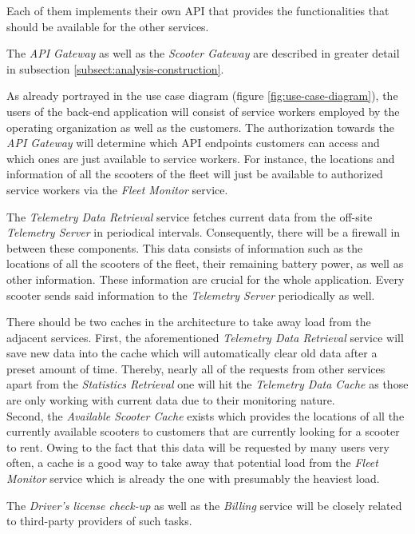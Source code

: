 \documentclass[12pt,a4paper,twoside]{report}
\begin{document}
Each of them implements their own API that provides the functionalities that
should be available for the other services.

The \textit{API Gateway} as well as the \textit{Scooter Gateway} are described
in greater detail in subsection \ref{subsect:analysis-construction}.

As already portrayed in the use case diagram (figure \ref{fig:use-case-diagram}),
the users of the back-end application will consist of service workers employed
by the operating organization as well as the customers.
The authorization towards the \textit{API Gateway} will determine which
API endpoints customers can access and which ones are just available to
service workers. For instance, the locations and information of all the scooters
of the fleet will just be available to authorized service workers via the
\textit{Fleet Monitor} service.

The \textit{Telemetry Data Retrieval} service fetches current data from the
off-site \textit{Telemetry Server} in periodical intervals.
Consequently, there will be a firewall in between these components.
This data consists of information such as the locations of all the scooters
of the fleet, their remaining battery power, as well as other information.
These information are crucial for the whole application.
Every scooter sends said information to the \textit{Telemetry Server}
periodically as well.

There should be two caches in the architecture to take away load from the
adjacent services. First, the aforementioned \textit{Telemetry Data Retrieval}
service will save new data into the cache which will automatically clear old
data after a preset amount of time. Thereby, nearly all of the requests from
other services apart from the \textit{Statistics Retrieval} one will hit the
\textit{Telemetry Data Cache} as those are only working with current data due
to their monitoring nature.\\
Second, the \textit{Available Scooter Cache} exists which provides the locations
of all the currently available scooters to customers that are currently looking
for a scooter to rent. Owing to the fact that this data will be requested by
many users very often, a cache is a good way to take away that potential load
from the \textit{Fleet Monitor} service which is already the one with
presumably the heaviest load.

The \textit{Driver's license check-up} as well as the \textit{Billing} service
will be closely related to third-party providers of such tasks.\\
\end{document}
